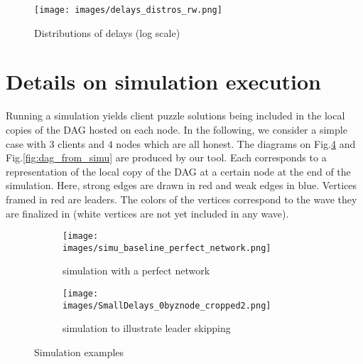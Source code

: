 \begin{figure}[h]
\vspace*{-.25cm}
    \centering
    \texttt{[image: images/delays\_distros\_rw.png]}
    \caption{Distributions of delays (log scale)}
    \label{fig:delays_distros}
\vspace*{-.25cm}
\end{figure}





\section{Details on simulation execution\label{anx:max_sim_exec}}


Running a simulation yields client puzzle solutions being included in the local copies of the DAG hosted on each node.
In the following, we consider a simple case with $3$ clients and $4$ nodes which are all honest.
The diagrams on Fig.\ref{fig:dag_simu_further_discussion} and Fig.\ref{fig:dag_from_simu} are produced by our tool. 
Each corresponds to a representation of the local copy of the DAG at a certain node at the end of the simulation. 
Here, strong edges are drawn in red and weak edges in blue.
Vertices framed in red are leaders.
The colors of the vertices correspond to the wave they are finalized in (white vertices are not yet included in any wave).


\begin{figure}[h]
    \centering

    \begin{subfigure}{.475\textwidth}
        \texttt{[image: images/simu\_baseline\_perfect\_network.png]}
        \caption{simulation with a perfect network}
        \label{fig:dag_from_simu_perfect}
    \end{subfigure}
    
    \begin{subfigure}{.475\textwidth}
        \texttt{[image: images/SmallDelays\_0byznode\_cropped2.png]}
        \caption{simulation to illustrate leader skipping}
        \label{fig:dag_from_simu_quickest}
    \end{subfigure}
    
    \caption{Simulation examples}
    \label{fig:dag_simu_further_discussion}
\end{figure}


